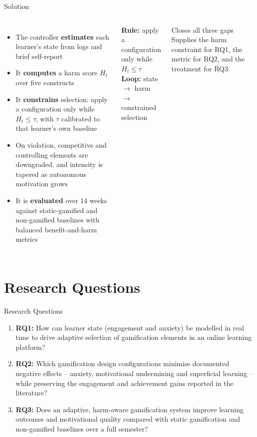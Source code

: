 \documentclass[10pt]{beamer}
\begin{document}
\begin{frame}{Solution}
\begin{columns}[T]
    \begin{itemize}
        \item The controller \textbf{estimates} each learner's state from logs and brief
        self-report
        \item It \textbf{computes} a harm score $H_t$ over five constructs
        \item It \textbf{constrains} selection: apply a configuration only while
        $H_t \le \tau$, with $\tau$ calibrated to that learner's own baseline
        \item On violation, competitive and controlling elements are downgraded, and intensity
        is tapered as autonomous motivation grows \cite{gao2024sdt}
        \item It is \textbf{evaluated} over 14 weeks against static-gamified and non-gamified
        baselines with balanced benefit-and-harm metrics
    \end{itemize}
    \begin{keybox}\small
    \textbf{Rule:} apply a configuration only while $H_t \le \tau$\\[2pt]
    \textbf{Loop:} state $\rightarrow$ harm $\rightarrow$ constrained selection
    \end{keybox}
    \vspace{0.2cm}
    \begin{block}{Closes all three gaps}
    Supplies the harm constraint for RQ1, the metric for RQ2, and the treatment for RQ3.
    \end{block}
\end{columns}
\end{frame}


\section{Research Questions}

\begin{frame}{Research Questions}
\begin{enumerate}\itemsep6pt
    \item \textbf{RQ1:} How can learner state (engagement and anxiety) be modelled in real time
    to drive adaptive selection of gamification elements in an online learning platform?
    \item \textbf{RQ2:} Which gamification design configurations minimise documented negative
    effects -- anxiety, motivational undermining and superficial learning -- while preserving the
    engagement and achievement gains reported in the literature?
    \item \textbf{RQ3:} Does an adaptive, harm-aware gamification system improve learning
    outcomes and motivational quality compared with static gamification and non-gamified
    baselines over a full semester?
\end{enumerate}
\end{frame}
\end{document}
